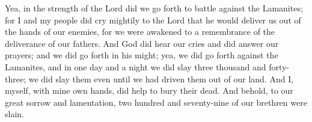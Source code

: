 \bverse \iffalse Yea, in the strength of the Lord did we go forth to battle against the Lamanites; for I and my people did cry mightily to the Lord that he would deliver us out of the hands of our enemies, for we were awakened to a remembrance of the deliverance of our fathers. \fi
Yea, in the strength of the Lord did we go forth to battle against the Lamanites; for I and my people did cry mightily to the Lord that he would deliver us out of the hands of our enemies, for we were awakened to a remembrance of the deliverance of our fathers.
\bverse \iffalse And God did hear our cries and did answer our prayers; and we did go forth in his might; yea, we did go forth against the Lamanites, and in one day and a night we did slay three thousand and forty-three; we did slay them even until we had driven them out of our land. \fi
And God did hear our cries and did answer our prayers; and we did go forth in his might; yea, we did go forth against the Lamanites, and in one day and a night we did slay three thousand and forty-three; we did slay them even until we had driven them out of our land.
\bverse \iffalse And I, myself, with mine own hands, did help to bury their dead. And behold, to our great sorrow and lamentation, two hundred and seventy-nine of our brethren were slain. \fi
And I, myself, with mine own hands, did help to bury their dead. And behold, to our great sorrow and lamentation, two hundred and seventy-nine of our brethren were slain.

